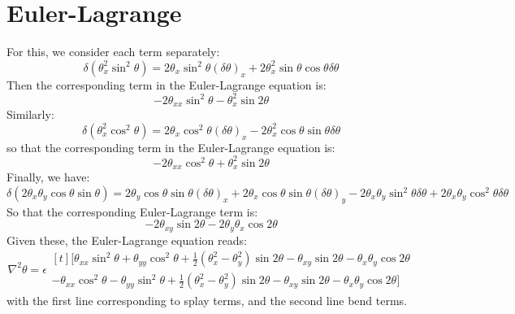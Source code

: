 \documentclass[reqno]{article}
\begin{document}
\section{Euler-Lagrange}

For this, we consider each term separately:
\begin{equation}
    \delta(\theta_x^2 \sin^2\theta)
    =
    2 \theta_x \sin^2\theta \left(\delta \theta\right)_x 
    + 2 \theta_x^2 \sin\theta \cos\theta \delta \theta
\end{equation}
Then the corresponding term in the Euler-Lagrange equation is:
\begin{equation}
    -2 \theta_{xx} \sin^2\theta
    -\theta_x^2 \sin2\theta
\end{equation}
Similarly:
\begin{equation}
    \delta(\theta_x^2 \cos^2\theta)
    =
    2 \theta_x \cos^2\theta \left(\delta \theta\right)_x 
    - 2 \theta_x^2 \cos\theta \sin\theta \delta \theta
\end{equation}
so that the corresponding term in the Euler-Lagrange equation is:
\begin{equation}
    -2 \theta_{xx} \cos^2\theta
    + \theta_x^2 \sin 2\theta
\end{equation}
Finally, we have:
\begin{equation}
    \delta \left( 2\theta_x \theta_y \cos\theta \sin \theta \right)
    =
    2 \theta_y \cos\theta \sin\theta \left(\delta \theta\right)_x
    + 2 \theta_x \cos\theta \sin\theta \left(\delta \theta\right)_y
    - 2 \theta_x \theta_y \sin^2\theta \delta \theta
    + 2 \theta_x \theta_y \cos^2\theta \delta \theta
\end{equation}
So that the corresponding Euler-Lagrange term is:
\begin{equation}
    -2 \theta_{xy} \sin2\theta
    - 2\theta_y \theta_x \cos 2\theta
\end{equation}
Given these, the Euler-Lagrange equation reads:
\begin{equation} \label{eq:euler-lagrange}
    \nabla^2 \theta
    =
    \epsilon
    \begin{multlined}[t]
    \bigl[
        \theta_{xx} \sin^2\theta
        + \theta_{yy} \cos^2 \theta
        + \tfrac12 \left( \theta_x^2 - \theta_y^2 \right) \sin 2\theta
        - \theta_{xy} \sin2\theta
        - \theta_x \theta_y \cos2\theta \\
        - \theta_{xx} \cos^2\theta
        - \theta_{yy} \sin^2 \theta
        + \tfrac12 \left( \theta_x^2 - \theta_y^2 \right) \sin 2\theta
        - \theta_{xy} \sin2\theta
        - \theta_x \theta_y \cos2\theta 
    \bigr]
    \end{multlined}
\end{equation}
with the first line corresponding to splay terms, and the second line bend terms.
\end{document}
